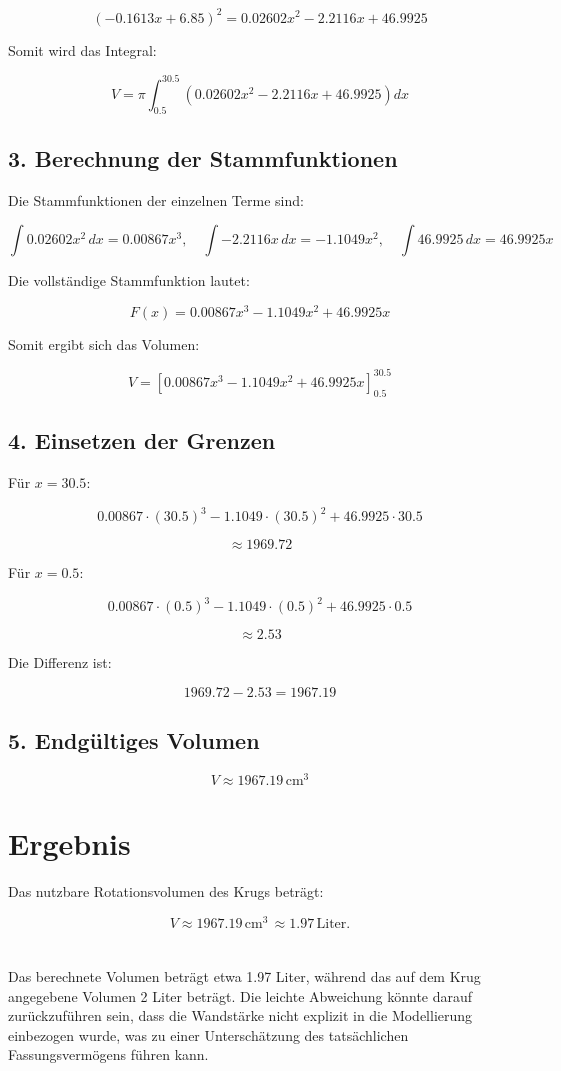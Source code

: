 \documentclass[a4paper,final]{report}
\begin{document}
\[
\left(-0.1613x + 6.85\right)^2 = 0.02602x^2 - 2.2116x + 46.9925
\]

Somit wird das Integral:

\[
V = \pi \int_{0.5}^{30.5} \left( 0.02602x^2 - 2.2116x + 46.9925 \right) dx
\]

\subsection{3. Berechnung der Stammfunktionen}

Die Stammfunktionen der einzelnen Terme sind:

\[
\int 0.02602x^2 \, dx = 0.00867 x^3, \quad \int -2.2116x \, dx = -1.1049 x^2, \quad \int 46.9925 \, dx = 46.9925 x
\]

Die vollständige Stammfunktion lautet:

\[
F(x) = 0.00867 x^3 - 1.1049 x^2 + 46.9925 x
\]

Somit ergibt sich das Volumen:

\[
V = \left[ 0.00867 x^3 - 1.1049 x^2 + 46.9925 x \right]_{0.5}^{30.5}
\]

\subsection{4. Einsetzen der Grenzen}

Für \( x = 30.5 \):

\[
0.00867 \cdot (30.5)^3 - 1.1049 \cdot (30.5)^2 + 46.9925 \cdot 30.5
\]

\[
\approx 1969.72
\]

Für \( x = 0.5 \):

\[
0.00867 \cdot (0.5)^3 - 1.1049 \cdot (0.5)^2 + 46.9925 \cdot 0.5
\]

\[
\approx 2.53
\]

Die Differenz ist:

\[
1969.72 - 2.53 = 1967.19
\]

\subsection{5. Endgültiges Volumen}

\[
V \approx 1967.19 \, \text{cm}^3
\]

\section{Ergebnis}

Das nutzbare Rotationsvolumen des Krugs beträgt:

\[
V \approx 1967.19 \, \text{cm}^3 \, \approx 1.97 \, \text{Liter}.
\]\\ \\
Das berechnete Volumen beträgt etwa 1.97 Liter, während das auf dem Krug angegebene Volumen 2 Liter beträgt. Die leichte Abweichung könnte darauf zurückzuführen sein, dass die Wandstärke nicht explizit in die Modellierung einbezogen wurde, was zu einer Unterschätzung des tatsächlichen Fassungsvermögens führen kann.\\
\cite{geogebra3d}


      
\end{document}
